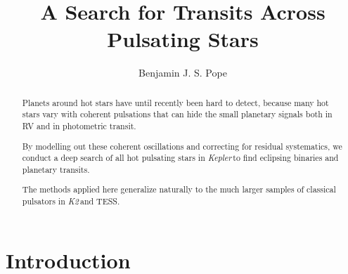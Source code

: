 \documentclass{aastex62}
\newcommand\kepler{\emph{Kepler}\,}
\newcommand\ktwo{\emph{K2}\,}
\begin{document}
\title{A Search for Transits Across Pulsating Stars}


\author[0000-0003-2595-9114]{Benjamin J. S. Pope}



\begin{abstract}
Planets around hot stars have until recently been hard to detect, because many hot stars vary with coherent pulsations that can hide the small planetary signals both in RV and in photometric transit.

By modelling out these coherent oscillations and correcting for residual systematics, we conduct a deep search of all hot pulsating stars in \kepler to find eclipsing binaries and planetary transits.

The methods applied here generalize naturally to the much larger samples of classical pulsators in \ktwo and TESS.
\end{abstract}



\section{Introduction} \label{sec:intro}
\end{document}
